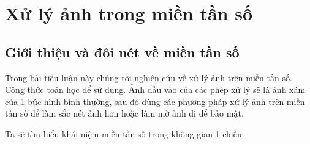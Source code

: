 \documentclass[12pt,a4paper]{report}
\numberwithin{equation}{section}
\theoremstyle{definition} %
\begin{document}
\chapter{\centering Xử lý ảnh trong miền tần số}

\section{Giới thiệu và đôi nét về miền tần số}
Trong bài tiểu luận này chúng tôi nghiên cứu về xử lý ảnh trên miền tần số. Công thức toán học để sử dụng. Ảnh đầu vào của các phép xử lý sẽ là ảnh xám của 1 bức hình bình thường, sau đó dùng các phương pháp xử lý ảnh trên miền tần số để làm sắc nét ảnh hơn hoặc làm mờ ảnh đi để 
bảo mật. 


Ta sẽ tìm hiểu khái niệm miền tần số trong không gian 1 chiều.
\end{document}
